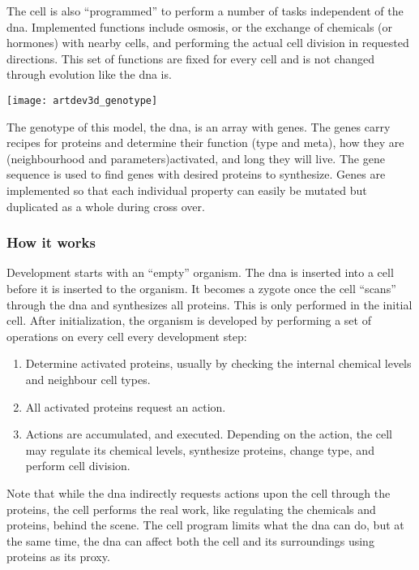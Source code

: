 The cell is also ``programmed'' to perform a number of tasks independent of the dna. Implemented functions include osmosis, or the exchange of chemicals (or hormones) with nearby cells, and performing the actual cell division in requested directions. This set of functions are fixed for every cell and is not changed through evolution like the dna is.

\begin{center}\texttt{[image: artdev3d\_genotype]}\end{center}

The genotype of this model, the dna, is an array with genes. The genes carry recipes for proteins and determine their function (type and meta), how they are (neighbourhood and parameters)activated, and long they will live. The gene sequence is used to find genes with desired proteins to synthesize. Genes are implemented so that each individual property can easily be mutated but duplicated as a whole during cross over.

\subsubsection{How it works}
Development starts with an ``empty'' organism. The dna is inserted into a cell before it is inserted to the organism. It becomes a zygote once the cell ``scans'' through the dna and synthesizes all proteins. This is only performed in the initial cell. After initialization, the organism is developed by performing a set of operations on every cell every development step:

\begin{enumerate}
	\itemsep=0pt
	\item Determine activated proteins, usually by checking the internal chemical levels and neighbour cell types.
	\item All activated proteins request an action.
	\item Actions are accumulated, and executed. Depending on the action, the cell may regulate its chemical levels, synthesize proteins, change type, and perform cell division.
\end{enumerate}

Note that while the dna indirectly requests actions upon the cell through the proteins, the cell performs the real work, like regulating the chemicals and proteins, behind the scene. The cell program limits what the dna can do, but at the same time, the dna can affect both the cell and its surroundings using proteins as its proxy.

